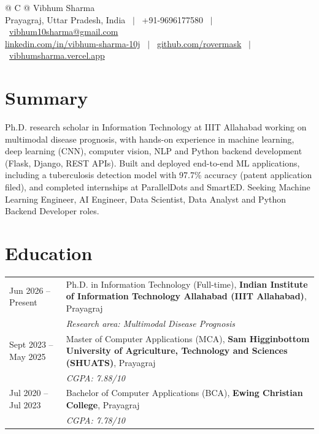 \documentclass[a4paper,11pt]{article}
\begin{document}
\pagestyle{empty}

\begin{tabularx}{\linewidth}{@{} C @{}}
\huge{Vibhum Sharma} \\[7.5pt]
Prayagraj, Uttar Pradesh, India \ $|$ \ +91-9696177580 \ $|$ \
\href{mailto:vibhum10sharma@gmail.com}{vibhum10sharma@gmail.com} \\[3pt]
\href{https://linkedin.com/in/vibhum-sharma-10j}{linkedin.com/in/vibhum-sharma-10j} \ $|$ \
\href{https://github.com/rovermask}{github.com/rovermask} \ $|$ \
\href{https://vibhumsharma.vercel.app}{vibhumsharma.vercel.app} \\
\end{tabularx}

\section{Summary}
Ph.D. research scholar in Information Technology at IIIT Allahabad working on multimodal disease
prognosis, with hands-on experience in machine learning, deep learning (CNN), computer vision, NLP
and Python backend development (Flask, Django, REST APIs). Built and deployed end-to-end ML
applications, including a tuberculosis detection model with 97.7\% accuracy (patent application filed),
and completed internships at ParallelDots and SmartED. Seeking Machine Learning Engineer, AI Engineer,
Data Scientist, Data Analyst and Python Backend Developer roles.

\section{Education}
\begin{tabularx}{\linewidth}{@{}l @{\hspace{1.5em}} X@{}}
Jun 2026 -- Present & Ph.D. in Information Technology (Full-time), \textbf{Indian Institute of Information Technology Allahabad (IIIT Allahabad)}, Prayagraj \\
& \textit{Research area: Multimodal Disease Prognosis} \\[6pt]

Sept 2023 -- May 2025 & Master of Computer Applications (MCA), \textbf{Sam Higginbottom University of Agriculture, Technology and Sciences (SHUATS)}, Prayagraj \\
& \textit{CGPA: 7.88/10} \\[6pt]

Jul 2020 -- Jul 2023 & Bachelor of Computer Applications (BCA), \textbf{Ewing Christian College}, Prayagraj \\
& \textit{CGPA: 7.78/10} \\[6pt]
\end{tabularx}
\end{document}
